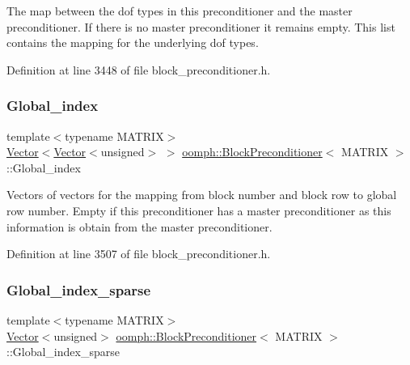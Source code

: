The map between the dof types in this preconditioner and the master preconditioner. If there is no master preconditioner it remains empty. This list contains the mapping for the underlying dof types. 



Definition at line 3448 of file block\+\_\+preconditioner.\+h.

\mbox{\label{classoomph_1_1BlockPreconditioner_a79ea9c428aa8533c371ef3f0048a3a92}} 
\subsubsection{\texorpdfstring{Global\+\_\+index}{Global\_index}}
{\footnotesize\ttfamily template$<$typename M\+A\+T\+R\+IX$>$ \\
\hyperlink{classoomph_1_1Vector}{Vector}$<$\hyperlink{classoomph_1_1Vector}{Vector}$<$unsigned$>$ $>$ \hyperlink{classoomph_1_1BlockPreconditioner}{oomph\+::\+Block\+Preconditioner}$<$ M\+A\+T\+R\+IX $>$\+::Global\+\_\+index\hspace{0.3cm}{\ttfamily [private]}}



Vectors of vectors for the mapping from block number and block row to global row number. Empty if this preconditioner has a master preconditioner as this information is obtain from the master preconditioner. 



Definition at line 3507 of file block\+\_\+preconditioner.\+h.

\mbox{\label{classoomph_1_1BlockPreconditioner_ae7a8d4a769319bffc94432a3c4adf30b}} 
\subsubsection{\texorpdfstring{Global\+\_\+index\+\_\+sparse}{Global\_index\_sparse}}
{\footnotesize\ttfamily template$<$typename M\+A\+T\+R\+IX$>$ \\
\hyperlink{classoomph_1_1Vector}{Vector}$<$unsigned$>$ \hyperlink{classoomph_1_1BlockPreconditioner}{oomph\+::\+Block\+Preconditioner}$<$ M\+A\+T\+R\+IX $>$\+::Global\+\_\+index\+\_\+sparse\hspace{0.3cm}{\ttfamily [private]}}



